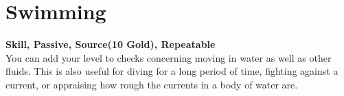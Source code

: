 \section{Swimming}\label{sec:swimming}
\textbf{Skill, Passive, Source(10 Gold), Repeatable}\\
You can add your level to checks concerning moving in water as well as other fluids.
This is also useful for diving for a long period of time, fighting against a current, or appraising how rough the currents in a body of water are.